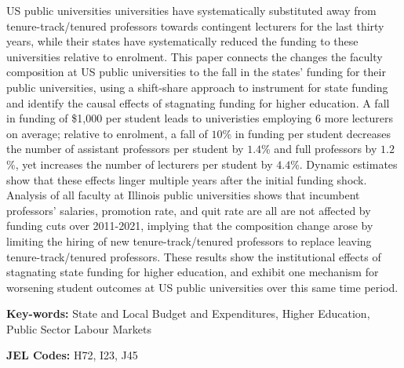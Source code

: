 US public universities universities have systematically substituted away from tenure-track/tenured professors towards contingent lecturers for the last thirty years, while their states have systematically reduced the funding to these universities relative to enrolment.
This paper connects the changes the faculty composition at US public universities to the fall in the states' funding for their public universities, using a shift-share approach to instrument for state funding and identify the causal effects of stagnating funding for higher education.
A fall in funding of \$1,000 per student leads to univeristies employing 6 more lecturers on average; relative to enrolment, a fall of $10$\% in funding per student decreases the number of assistant professors per student by $1.4$\% and full professors by $1.2$\%, yet increases the number of lecturers per student by $4.4$\%.
Dynamic estimates show that these effects linger multiple years after the initial funding shock.
Analysis of all faculty at Illinois public universities shows that incumbent professors' salaries, promotion rate, and quit rate are all are not affected by funding cuts over 2011-2021, implying that the composition change arose by limiting the hiring of new tenure-track/tenured professors to replace leaving tenure-track/tenured professors.
These results show the institutional effects of stagnating state funding for higher education, and exhibit one mechanism for worsening student outcomes at US public universities over this same time period.

\vfill
\noindent
\textbf{Key-words:}
State and Local Budget and Expenditures,
Higher Education,
Public Sector Labour Markets

\vspace{0.1cm}
\noindent
\textbf{JEL Codes:} H72, I23, J45

